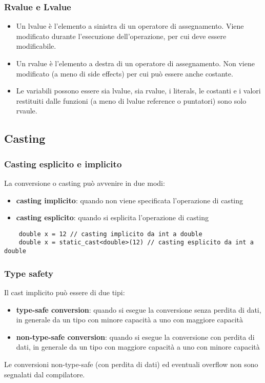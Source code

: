 \documentclass[a4paper]{article}
\begin{document}
\subsubsection*{Rvalue e Lvalue}
\begin{itemize}
	\item Un lvalue è l'elemento a sinistra di un operatore di assegnamento. Viene modificato durante l'esecuzione dell'operazione, per cui
	deve essere modificabile.
	\item Un rvalue è l'elemento a destra di un operatore di assegnamento. Non viene modificato (a meno di side effects) per cui può essere
	anche costante.
	\item Le variabili possono essere sia lvalue, sia rvalue, i literals, le costanti e i valori restituiti dalle funzioni (a meno di lvalue
	reference o puntatori) sono solo rvaule.
\end{itemize}

\newpage

\subsection{Casting} \label{casting}
\subsubsection*{Casting esplicito e implicito}
La conversione o casting può avvenire in due modi:
\begin{itemize}
	\item \textbf{casting implicito}: quando non viene specificata l'operazione di casting
	\item \textbf{casting esplicito}: quando si esplicita l'operazione di casting
\end{itemize}
\begin{lstlisting}
	double x = 12 // casting implicito da int a double
	double x = static_cast<double>(12) // casting esplicito da int a double
\end{lstlisting}

\subsubsection*{Type safety}
Il cast implicito può essere di due tipi:
\begin{itemize}
	\item \textbf{type-safe conversion}: quando si esegue la conversione senza perdita di dati, in generale da un tipo con
	minore capacità a uno con maggiore capacità
	\item \textbf{non-type-safe conversion}: quando si esegue la conversione con perdita di dati, in generale da un tipo con
	maggiore capacità a uno con minore capacità
\end{itemize}
Le conversioni non-type-safe (con perdita di dati) ed eventuali overflow non sono segnalati dal compilatore.
\end{document}
